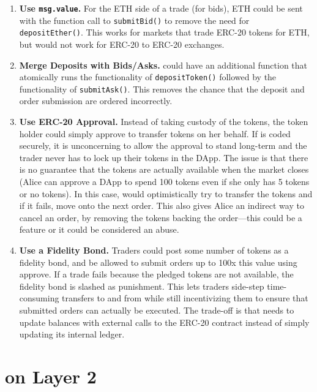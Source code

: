 \begin{enumerate}

\item \textbf{Use \texttt{msg.value}.} For the ETH side of a trade (\ie for bids), ETH could be sent with the function call to \texttt{submitBid()} to remove the need for    \texttt{depositEther()}. This works for markets that trade ERC-20 tokens for ETH, but would not work for ERC-20 to ERC-20 exchanges. 

\item \textbf{Merge Deposits with Bids/Asks.} \cm could have an additional function that atomically runs the functionality of \texttt{depositToken()} followed by the functionality of \texttt{submitAsk()}. This removes the chance that the deposit and order submission are ordered incorrectly.

\item \textbf{Use ERC-20 Approval.} Instead of \cm taking custody of the tokens, the token holder could simply approve \cm to transfer tokens on her behalf. If \cm is coded securely, it is unconcerning to allow the approval to stand long-term and the trader never has to lock up their tokens in the DApp. The issue is that there is no guarantee that the tokens are actually available when the market closes (\ie Alice can approve a DApp to spend 100 tokens even if she only has 5 tokens or no tokens). In this case, \cm would optimistically try to transfer the tokens and if it fails, move onto the next order. This also gives Alice an indirect way to cancel an order, by removing the tokens backing the order---this could be a feature or it could be considered an abuse.

\item \textbf{Use a Fidelity Bond.} Traders could post some number of tokens as a fidelity bond, and be allowed to submit orders up to 100x this value using approve. If a trade fails because the pledged tokens are not available, the fidelity bond is slashed as punishment. This lets traders side-step time-consuming transfers to and from \cm while still incentivizing them to ensure that submitted orders can actually be executed. The trade-off  is that \cm needs to update balances with external calls to the ERC-20 contract instead of simply updating its internal ledger. 

\end{enumerate}

\section{\cm on Layer 2}\label{sec:rollups}

